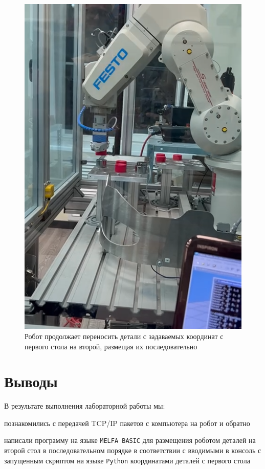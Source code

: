 \documentclass[a4paper, 12pt]{article}
\begin{document}
    \begin{figure}[H]
        \centering
        \includegraphics[scale=1]{repeat.png}
        \captionsetup{skip=0pt}
        \caption{Робот продолжает переносить детали с задаваемых координат с первого стола на второй, размещая их последовательно}
        \label{fig:repeat}
    \end{figure}


    \newpage
    \section{Выводы}
    В результате выполнения лабораторной работы мы:
    \begin{compactitem}
        \item познакомились с передачей TCP/IP пакетов с компьютера на робот и обратно
        \item написали программу на языке \texttt{MELFA BASIC} для размещения
        роботом деталей на второй стол в последовательном порядке в соответствии
        с вводимыми в консоль с запущенным скриптом на языке \texttt{Python}
        координатами деталей с первого стола
    \end{compactitem}
\end{document}
